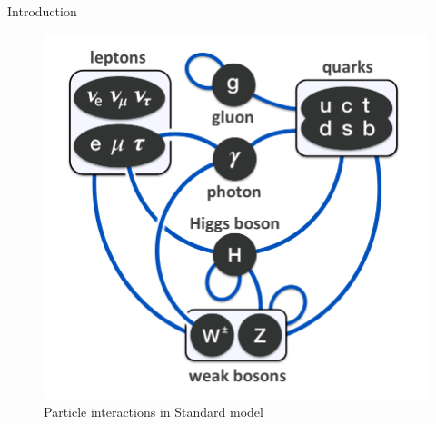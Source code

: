 \begin{chapter}{Introduction}


	\begin{figure}[ht]
		\centering
		\includegraphics[scale=0.35]{Chapter1/sm.png}
		\caption[Particle interactions in Standard model]{Particle interactions in Standard model\cite{smi}}
		\label{sm}
	\end{figure}


\end{chapter}
